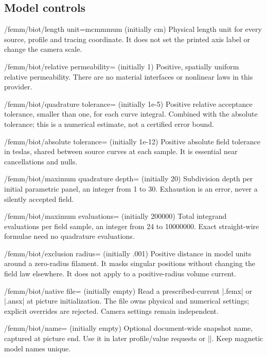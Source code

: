 \subsection{Model controls}
\begin{key}{/femm/biot/length unit=m\textbar cm\textbar mm\textbar um (initially cm)}
Physical length unit for every source, profile and tracing coordinate. It does not set the printed axis label or change the camera scale.
\end{key}
\begin{key}{/femm/biot/relative permeability= (initially 1)}
Positive, spatially uniform relative permeability. There are no material interfaces or nonlinear laws in this provider.
\end{key}
\begin{key}{/femm/biot/quadrature tolerance= (initially 1e-5)}
Positive relative acceptance tolerance, smaller than one, for each curve integral. Combined with the absolute tolerance; this is a numerical estimate, not a certified error bound.
\end{key}
\begin{key}{/femm/biot/absolute tolerance= (initially 1e-12)}
Positive absolute field tolerance in teslas, shared between source curves at each sample. It is essential near cancellations and nulls.
\end{key}
\begin{key}{/femm/biot/maximum quadrature depth= (initially 20)}
Subdivision depth per initial parametric panel, an integer from 1 to 30. Exhaustion is an error, never a silently accepted field.
\end{key}
\begin{key}{/femm/biot/maximum evaluations= (initially 200000)}
Total integrand evaluations per field sample, an integer from 24 to 10000000. Exact straight-wire formulae need no quadrature evaluations.
\end{key}
\begin{key}{/femm/biot/exclusion radius= (initially .001)}
Positive distance in model units around a zero-radius filament. It masks singular positions without changing the field law elsewhere. It does not apply to a positive-radius volume current.
\end{key}
\begin{key}{/femm/biot/native file= (initially empty)}
Read a prescribed-current |.femx| or |.ansx| at picture initialization. The file owns physical and numerical settings; explicit overrides are rejected. Camera settings remain independent.
\end{key}
\begin{key}{/femm/biot/name= (initially empty)}
Optional document-wide snapshot name, captured at picture end. Use it in later profile/value requests or |\femmsave[model=...]|. Keep magnetic model names unique.
\end{key}
